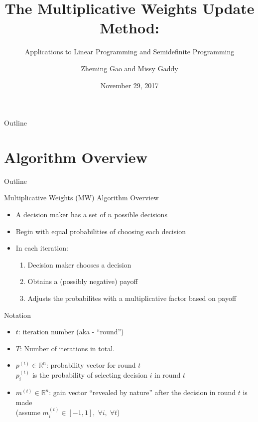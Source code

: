 \documentclass{beamer}
\title[MW Algorithm]{The Multiplicative Weights Update Method:}
\subtitle{Applications to Linear Programming and Semidefinite Programming}
\author[Gao, Gaddy]{Zheming Gao and Missy Gaddy}
\institute{Based on paper by Arora, Hazan, and Kale (2012)}
\date{November 29, 2017}
\begin{document}
\begin{frame}
  \titlepage
\end{frame}
\begin{frame}{Outline}
  \tableofcontents 
\end{frame}

\section{Algorithm Overview}
\begin{frame}{Outline}
  \tableofcontents[currentsection]
\end{frame}

\begin{frame}{Multiplicative Weights (MW) Algorithm Overview}
\begin{itemize}
\item A decision maker has a set of $n$ possible decisions
\item Begin with equal probabilities of choosing each decision
\item In each iteration:
\begin{enumerate}
\setlength\itemsep{1em}
\item Decision maker chooses a decision
\item Obtains a (possibly negative) payoff
\item Adjusts the probabilites with a multiplicative factor based on payoff
\end{enumerate}
\end{itemize}
\end{frame}

\begin{frame}{Notation}
\begin{itemize}
\setlength\itemsep{2em}

\item $t$: iteration number (aka - ``round'') 
\item $T$: Number of iterations in total.

\item $p^{(t)} \in \mathbb{R}^n$: probability vector for round $t$ \\
 $p^{(t)}_i$ is the probability of selecting decision $i$ in round $t$ \\
\item $m^{(t)} \in \mathbb{R}^n$: gain vector ``revealed by nature'' after the decision in round $t$ is made \\
 (assume $m_i^{(t)} \in [-1, 1], \; \forall i, \; \forall t$)
\end{itemize}
\end{frame}
\end{document}
